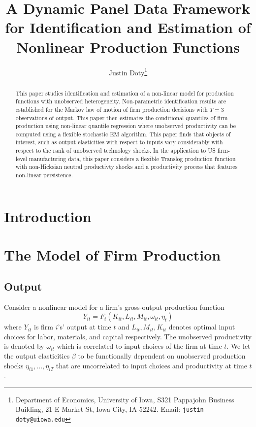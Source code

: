 \documentclass{article}
\title{A Dynamic Panel Data Framework for Identification and Estimation of Nonlinear Production Functions}
\author{Justin Doty\thanks{Department of Economics, University of Iowa, S321 Pappajohn Business Building, 21 E Market St, Iowa City, IA 52242. Email: \texttt{justin-doty@uiowa.edu}}
}
\date{\vspace{-5ex}}
\begin{document}
\maketitle{}

\begin{abstract}
This paper studies identification and estimation of a non-linear model for production functions with unobserved heterogeneity. Non-parametric identification results are established for the Markov law of motion of firm production decisions with $T=3$ observations of output. This paper then estimates the conditional quantiles of firm production using non-linear quantile regression where unobserved productivity can be computed using a flexible stochastic EM algorithm. This paper finds that objects of interest, such as output elasticities with respect to inputs vary considerably with respect to the rank of unobserved technology shocks. In the application to US firm-level manufacturing data, this paper considers a flexible Translog production function with non-Hicksian neutral productivty shocks and a productivity process that features non-linear persistence.
\end{abstract}

\section{Introduction}

\section{The Model of Firm Production}

\subsection{Output}
Consider a nonlinear model for a firm's gross-output production function
\begin{equation}\label{modelY}
Y_{it}=F_{t}(K_{it}, L_{it}, M_{it}, \omega_{it}, \eta_{t})
\end{equation}
where $Y_{it}$ is firm $i$'s' output at time $t$ and $L_{it}, M_{it}, K_{it}$ denotes optimal input choices for labor, materials, and capital respectively. The unobserved productivity is denoted by $\omega_{it}$ which is correlated to input choices of the firm at time $t$. We let the output elasticities $\beta$ to be functionally dependent on unobserved production shocks $\eta_{i1},\dots, \eta_{iT}$ that are uncorrelated to input choices and productivity at time $t$.\\
\end{document}
